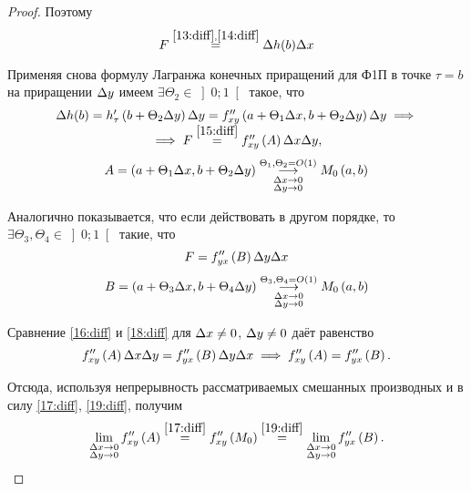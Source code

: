\documentclass[../../main.tex]{subfiles}
\begin{document}
\begin{proof}
		Поэтому 
		\begin{equation}
			F\overset{\eqref{13:diff},\eqref{14:diff}}{=} \Delta h(b)\Delta x
			\label{15:diff}
		\end{equation}
		
		Применяя снова формулу Лагранжа конечных приращений для Ф1П в точке 
		$\tau = b$ на приращении $\Delta y$ имеем 
		$\exists \Theta_2\in\left]0;1\right[$ такое, что
		\begin{equation}
		\begin{array}{c}
            \Delta h(b) = h'_\tau\left(b + \Theta_2\Delta y\right)\Delta y = 
            f''_{xy}\left(a + \Theta_1\Delta x, b + \Theta_2\Delta y\right)\Delta 
            y\implies \\
			\implies F\overset{\eqref{15:diff}}{=} f''_{xy}\left(A\right)\Delta x
			\Delta y,
			\label{16:diff}
		\end{array}
		\end{equation}
		\begin{equation}
			A = \left(a + \Theta_1\Delta x, b + \Theta_2\Delta y\right)
			\underset{\substack{\Delta x\rightarrow 0\\
			\Delta y\rightarrow 0}}{\overset{\Theta_1, \Theta_2 = O(1)}
			{\longrightarrow}} M_0\left(a, b\right)
			\label{17:diff}
		\end{equation}
		
		Аналогично показывается, что если действовать в другом порядке, то 
		$\exists \Theta_3, \Theta_4\in\left]0;1\right[$ такие, что
		\begin{equation}
			F = f''_{yx}\left(B\right)\Delta y\Delta x
			\label{18:diff}
		\end{equation}
		\begin{equation}
			B = \left(a + \Theta_3\Delta x, b + \Theta_4\Delta y\right)
			\underset{\substack{\Delta x\rightarrow 0\\
			\Delta y\rightarrow 0}}{\overset{\Theta_3,\Theta_4 = O(1)}
			{\longrightarrow}} M_0\left(a, b\right)
			\label{19:diff}
		\end{equation}
		
		Сравнение \eqref{16:diff} и \eqref{18:diff} для $\Delta x\ne0$, 
		$\Delta y\ne0$ даёт равенство
		\[f''_{xy}\left(A\right)\Delta x\Delta y = f''_{yx}\left(B\right)\Delta y\Delta x
		\implies f''_{xy}\left(A\right) = f''_{yx}\left(B\right).\]
		
		Отсюда, используя непрерывность рассматриваемых смешанных 
		производных и в силу \eqref{17:diff}, \eqref{19:diff}, получим
		\[\lim_{
			\substack{\Delta x\rightarrow0\\
					\Delta y\rightarrow 0}
				}f''_{xy}\left(A\right)\overset{\eqref{17:diff}}{=}
		f''_{xy}\left(M_0\right)\overset{\eqref{19:diff}}{=}
		\lim_{
			\substack{\Delta x\rightarrow0\\
					\Delta y\rightarrow0}
				}f''_{yx}\left(B\right).\]
	\end{proof}
\end{document}
